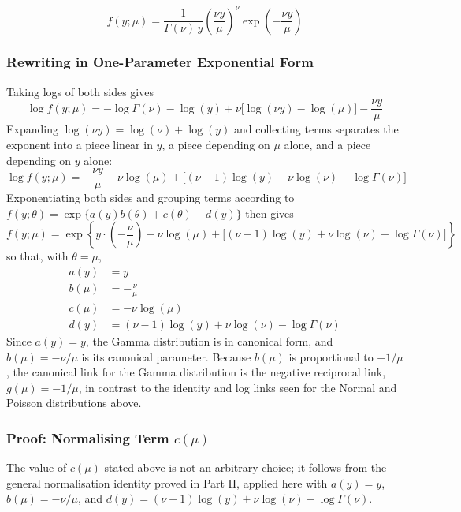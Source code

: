 \documentclass[12pt,a4paper]{report}
\begin{document}
\[
f(y;\mu) = \frac{1}{\Gamma(\nu)\,y}\left(\frac{\nu y}{\mu}\right)^{\nu}\exp\left(-\frac{\nu y}{\mu}\right)
\]

\subsubsection*{Rewriting in One-Parameter Exponential Form}

Taking logs of both sides gives
\[
\log f(y;\mu) = -\log\Gamma(\nu) - \log(y) + \nu\big[\log(\nu y) - \log(\mu)\big] - \frac{\nu y}{\mu}
\]
Expanding $\log(\nu y) = \log(\nu) + \log(y)$ and collecting terms separates the exponent into a piece linear in $y$, a piece depending on $\mu$ alone, and a piece depending on $y$ alone:
\[
\log f(y;\mu) = -\frac{\nu y}{\mu} - \nu\log(\mu) + \Big[(\nu-1)\log(y) + \nu\log(\nu) - \log\Gamma(\nu)\Big]
\]
Exponentiating both sides and grouping terms according to $f(y;\theta) = \exp\{a(y)b(\theta) + c(\theta) + d(y)\}$ then gives
\[
f(y;\mu) = \exp\left\{y\cdot\left(-\frac{\nu}{\mu}\right) - \nu\log(\mu) + \Big[(\nu-1)\log(y) + \nu\log(\nu) - \log\Gamma(\nu)\Big]\right\}
\]
so that, with $\theta = \mu$,
\begin{align*}
a(y) &= y \\[4pt]
b(\mu) &= -\frac{\nu}{\mu} \\[4pt]
c(\mu) &= -\nu\log(\mu) \\[4pt]
d(y) &= (\nu-1)\log(y) + \nu\log(\nu) - \log\Gamma(\nu)
\end{align*}
Since $a(y) = y$, the Gamma distribution is in canonical form, and $b(\mu) = -\nu/\mu$ is its canonical parameter. Because $b(\mu)$ is proportional to $-1/\mu$, the canonical link for the Gamma distribution is the negative reciprocal link, $g(\mu) = -1/\mu$, in contrast to the identity and log links seen for the Normal and Poisson distributions above.

\subsubsection*{Proof: Normalising Term $c(\mu)$}

The value of $c(\mu)$ stated above is not an arbitrary choice; it follows from the general normalisation identity proved in Part II, applied here with $a(y) = y$, $b(\mu) = -\nu/\mu$, and $d(y) = (\nu-1)\log(y) + \nu\log(\nu) - \log\Gamma(\nu)$.
\end{document}
